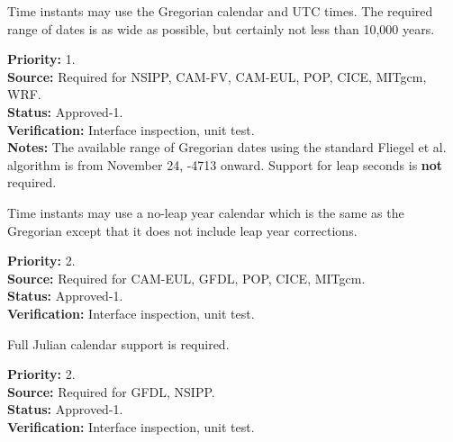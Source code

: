 Time instants may use the Gregorian calendar and UTC times.  The required 
range of dates is as wide as possible, but certainly not less than 10,000 years.
\begin{reqlist}
{\bf Priority:} 1.\\
{\bf Source:} Required for NSIPP, CAM-FV, CAM-EUL, POP, CICE, MITgcm, WRF. \\
{\bf Status:} Approved-1. \\
{\bf Verification:} Interface inspection, unit test. \\
{\bf Notes:} The available range of Gregorian dates using the standard 
Fliegel et al.\cite{Fli68} algorithm is from November 24, -4713 onward.
Support for leap seconds is {\bf not} required.
\end{reqlist}

Time instants may use a no-leap year calendar which is the same as the Gregorian
except that it does not include leap year corrections.  
\begin{reqlist}
{\bf Priority:} 2. \\
{\bf Source:} Required for CAM-EUL, GFDL, POP, CICE, MITgcm. \\
{\bf Status:} Approved-1. \\
{\bf Verification:} Interface inspection, unit test. 
\end{reqlist}

Full Julian calendar support is required.
\begin{reqlist}
{\bf Priority:} 2. \\
{\bf Source:} Required for GFDL, NSIPP. \\
{\bf Status:} Approved-1. \\
{\bf Verification:} Interface inspection, unit test. 
\end{reqlist}

